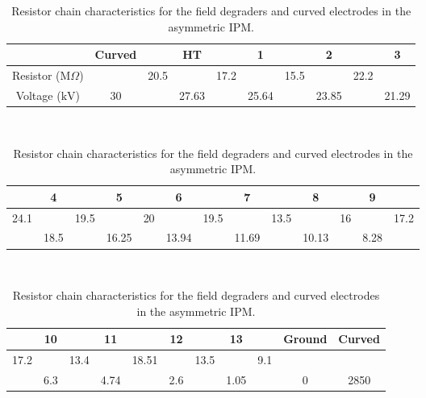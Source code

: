 \begin{table}[ht]
  \caption[Resistor chain characteristics for the field degraders and curved electrodes in the asymmetric IPM]
  {Resistor chain characteristics for the field degraders and curved electrodes in the asymmetric IPM.}
  \label{chap3:resistor_asym}
  \begin{tabularx}{1\textwidth}{cccccccccc}
    \toprule
                                             & \bfseries Curved &      & \textbf{HT}    &      & \bfseries 1    &      & \textbf{2}     &      & \textbf{3}     \\
    \midrule
    Resistor (\(\mathrm{M}\Omega\)) &        & 20.5 &       & 17.2 &       & 15.5 &       & 22.2         \\
    Voltage (\(\mathrm{kV}\))       & 30     &      & 27.63 &      & 25.64 &      & 23.85 &      & 21.29 \\
    \bottomrule
  \end{tabularx}
  \medskip
  \\
  \begin{tabularx}{1\textwidth}{ccccccccccccc}
    \toprule
         & \textbf{4}    &      & \textbf{5}     &    & \textbf{6}     &      & 7     &      & 8     &    & 9    &      \\
    \midrule
    24.1 &      & 19.5 &       & 20 &       & 19.5 &       & 13.5 &       & 16 &      & 17.2 \\
         & 18.5 &      & 16.25 &    & 13.94 &      & 11.69 &      & 10.13 &    & 8.28 &      \\
    \bottomrule
  \end{tabularx}
  \medskip
  \\
  \begin{tabularx}{1\textwidth}{ccccccccccc}
    \toprule
         & \textbf{10}  &      & \textbf{11}   &       & \textbf{12}  &      & \textbf{13}   &     & \textbf{Ground} & \textbf{Curved} \\
    \midrule
    17.2 &     & 13.4 &      & 18.51 &     & 13.5 &      & 9.1 &     &        \\
         & 6.3 &      & 4.74 &       & 2.6 &      & 1.05 &     & 0   & 2850   \\
    \bottomrule
  \end{tabularx}
\end{table}